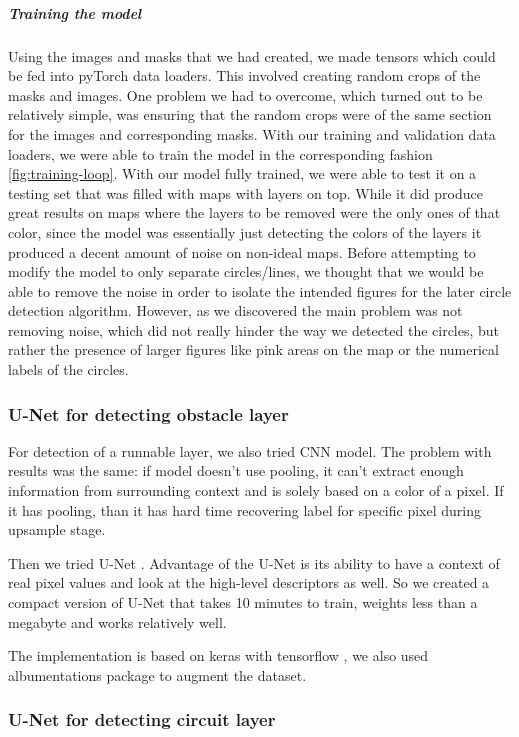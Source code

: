 \documentclass[a4paper,12pt]{extarticle}
\begin{document}
\subparagraph{Training the model\\}
Using the images and masks that we had created, we made tensors which could be fed into pyTorch data loaders.
This involved creating random crops of the masks and images. One problem we had to overcome, which turned out to be relatively simple, was ensuring that the random crops were of the same section for the images and corresponding masks. With our training and validation data loaders, we were able to train the model in the corresponding fashion \ref{fig:training-loop}. With our model fully trained, we were able to test it on a testing set that was filled with maps with layers on top. While it did produce great results on maps where the layers to be removed were the only ones of that color, since the model was essentially just detecting the colors of the layers it produced a decent amount of noise on non-ideal maps. Before attempting to modify the model to only separate circles/lines, we thought that we would be able to remove the noise in order to isolate the intended figures for the later circle detection algorithm. However, as we discovered the main problem was not removing noise, which did not really hinder the way we detected the circles, but rather the presence of larger figures like pink areas on the map or the numerical labels of the circles. 

\subsubsection{U-Net for detecting obstacle layer}

For detection of a runnable layer, we also tried CNN model.
The problem with results was the same: if model doesn't use pooling, it can't extract enough information from surrounding context and is solely based on a color of a pixel.
If it has pooling, than it has hard time recovering label for specific pixel during upsample stage.

Then we tried U-Net \cite{UNet}. Advantage of the U-Net is its ability to have a context of real pixel values and look at the high-level descriptors as well.
So we created a compact version of U-Net that takes 10 minutes to train, weights less than a megabyte and works relatively well.

The implementation is based on keras with tensorflow \cite{keras}, we also used albumentations \cite{albumentations} package to augment the dataset.

\subsubsection{U-Net for detecting circuit layer}
\end{document}
